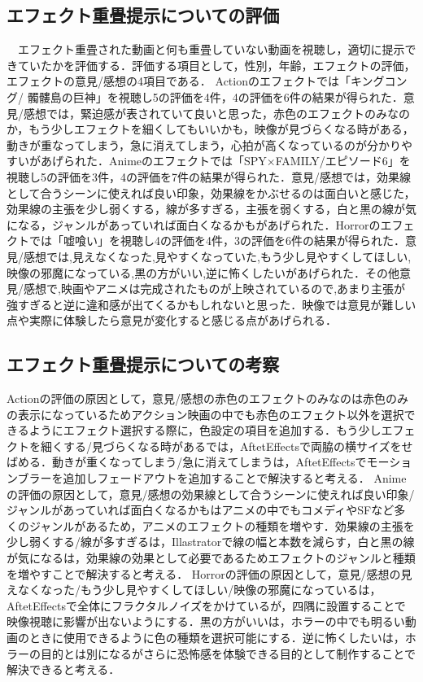 \subsection{エフェクト重畳提示についての評価}

　エフェクト重畳された動画と何も重畳していない動画を視聴し，適切に提示できていたかを評価する．評価する項目として，性別，年齢，エフェクトの評価，エフェクトの意見/感想の4項目である．
Actionのエフェクトでは「キングコング/ 髑髏島の巨神」を視聴し5の評価を4件，4の評価を6件の結果が得られた．意見/感想では，緊迫感が表されていて良いと思った，赤色のエフェクトのみなのか，もう少しエフェクトを細くしてもいいかも，映像が見づらくなる時がある，動きが重なってしまう，急に消えてしまう，心拍が高くなっているのが分かりやすいがあげられた．Animeのエフェクトでは「SPY×FAMILY/エピソード6」を視聴し5の評価を3件，4の評価を7件の結果が得られた．意見/感想では，効果線として合うシーンに使えれば良い印象，効果線をかぶせるのは面白いと感じた，効果線の主張を少し弱くする，線が多すぎる，主張を弱くする，白と黒の線が気になる，ジャンルがあっていれば面白くなるかもがあげられた．Horrorのエフェクトでは「嘘喰い」を視聴し4の評価を4件，3の評価を6件の結果が得られた．意見/感想では,見えなくなった,見やすくなっていた,もう少し見やすくしてほしい,映像の邪魔になっている,黒の方がいい,逆に怖くしたいがあげられた．その他意見/感想で,映画やアニメは完成されたものが上映されているので,あまり主張が強すぎると逆に違和感が出てくるかもしれないと思った．映像では意見が難しい点や実際に体験したら意見が変化すると感じる点があげられる．

\subsection{エフェクト重畳提示についての考察}
Actionの評価の原因として，意見/感想の赤色のエフェクトのみなのは赤色のみの表示になっているためアクション映画の中でも赤色のエフェクト以外を選択できるようにエフェクト選択する際に，色設定の項目を追加する．もう少しエフェクトを細くする/見づらくなる時があるでは，AftetEffectsで両脇の横サイズをせばめる．動きが重くなってしまう/急に消えてしまうは，AftetEffectsでモーションブラーを追加しフェードアウトを追加することで解決すると考える．
Animeの評価の原因として，意見/感想の効果線として合うシーンに使えれば良い印象/ジャンルがあっていれば面白くなるかもはアニメの中でもコメディやSFなど多くのジャンルがあるため，アニメのエフェクトの種類を増やす．効果線の主張を少し弱くする/線が多すぎるは，Illastratorで線の幅と本数を減らす，白と黒の線が気になるは，効果線の効果として必要であるためエフェクトのジャンルと種類を増やすことで解決すると考える．
Horrorの評価の原因として，意見/感想の見えなくなった/もう少し見やすくしてほしい/映像の邪魔になっているは，AftetEffectsで全体にフラクタルノイズをかけているが，四隅に設置することで映像視聴に影響が出ないようにする．黒の方がいいは，ホラーの中でも明るい動画のときに使用できるように色の種類を選択可能にする．逆に怖くしたいは，ホラーの目的とは別になるがさらに恐怖感を体験できる目的として制作することで解決できると考える．
